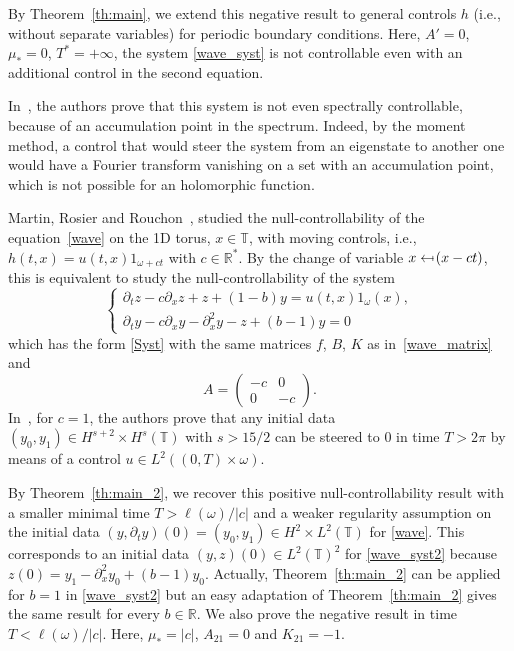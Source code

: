 \documentclass[11pt]{article}
\newcommand{\ie}{i.e.,\xspace}
\def\from{\mathchoice{\longleftarrow}{\leftarrow}{\leftarrow}{\leftarrow}}
\def\mfrom{\mathrel{\from\joinrel\mapstochar}}
\theoremstyle{plain}
\theoremstyle{definition}
\theoremstyle{remark}
\newcommand{\set}{\mathbb}
\newcommand{\R}{} %
\renewcommand{\R}{\set{R}}
\newcommand{\T}{\set{T}}
\begin{document}
By Theorem~\ref{th:main}, we extend this negative result to general controls $h$ (\ie without separate variables) for periodic boundary conditions.
Here, $A'=0$, $\mu_*=0$, $T^\ast=+\infty$, the system \eqref{wave_syst} is not controllable even with an additional control in the second equation.

In~\cite{rosier_2007}, the authors prove that this system is not even spectrally controllable, because of an accumulation point in the spectrum.
Indeed, by the moment method, a control that would steer the system from an eigenstate to another one would have a Fourier transform vanishing on a set with an accumulation point, which is not possible for an holomorphic function.

Martin, Rosier and Rouchon~\cite{martin_2013}, studied the null-controllability of the equation~\eqref{wave} on the 1D torus, $x\in\T$, with moving controls, \ie $h(t,x)=u(t,x) 1_{\omega+ct}$ with $c\in\R^*$.
By the change of variable $x \mfrom (x-ct)$, this is equivalent to study the null-controllability of the system
\begin{equation} \label{wave_syst2}
\begin{cases}
\partial_t z-c\partial_x z+z+(1-b)y= u(t,x) 1_{\omega}(x), \\
\partial_t y-c\partial_x y-\partial_x^2y -z + (b-1)y =0
\end{cases}
\end{equation}
which has the form \eqref{Syst} with the same matrices $f$, $B$, $K$ as in~\eqref{wave_matrix} and
\[
A=\begin{pmatrix}
-c & 0 \\ 0 & -c
\end{pmatrix}.
\]
In~\cite[Th.\,1.2]{martin_2013}, for $c\!=\!1$, the authors prove that any initial data \hbox{$(y_0,y_1)\!\in\! H^{s+2}\!\times\! H^{s}(\T)$} with $s>15/2$ can be steered to $0$ in time $T>2\pi$ by means of a control $u\in L^2((0,T)\times\omega)$.

By Theorem~\ref{th:main_2}, we recover this positive null-controllability result with a smaller minimal time $T>\ell(\omega)/|c|$ and a weaker regularity assumption on the initial data $(y,\partial_t y)(0)=(y_0,y_1)\in H^2 \times L^2(\T)$ for \eqref{wave}.
This corresponds to an initial data $(y,z)(0) \in L^2(\T)^2$ for \eqref{wave_syst2} because $z(0)=y_1-\partial_x^2 y_0 + (b-1)y_0$. Actually, Theorem~\ref{th:main_2} can be applied for $b=1$ in \eqref{wave_syst2} but an easy adaptation of Theorem~\ref{th:main_2} gives the same result for every $b \in \R$.
We also prove the negative result in time $T<\ell(\omega)/|c|$. Here, $\mu_*=|c|$, $A_{21}=0$ and $K_{21}=-1$.
\end{document}
